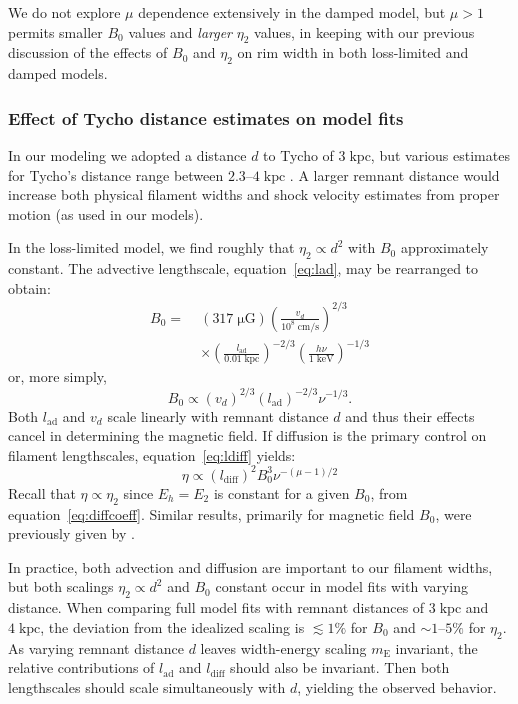 \documentclass[manuscript]{aastex}  %
\newcommand*{\mt}{\mathrm}
\newcommand*{\unit}[1]{\;\mt{#1}}  %
\newcommand*{\abt}{\mathord{\sim}} %
\newcommand*{\mE}{m_\mt{E}}
\newcommand*{\muG}{\unit{\mu G}}
\begin{document}
We do not explore $\mu$ dependence extensively in the damped model, but
$\mu > 1$ permits smaller $B_0$ values and \emph{larger} $\eta_2$ values, in
keeping with our previous discussion of the effects of $B_0$ and $\eta_2$ on
rim width in both loss-limited and damped models.

\subsubsection{Effect of Tycho distance estimates on model fits}

In our modeling we adopted a distance $d$ to Tycho of $3 \unit{kpc}$, but
various estimates for Tycho's distance range between $2.3$--$4 \unit{kpc}$
\citep{hayato2010}.  A larger remnant distance would increase both physical
filament widths and shock velocity estimates from proper motion (as used in our
models).

In the loss-limited model, we find roughly that $\eta_2 \propto d^2$ with
$B_0$ approximately constant.  The advective lengthscale,
equation~\eqref{eq:lad}, may be rearranged to obtain:
\begin{align}
    B_0 =\; &(317 \muG) \left(\frac{v_d}{10^8 \unit{cm/s}}\right)^{2/3}
                \nonumber \\
            &\times \left(\frac{l_{\mt{ad}}}{0.01 \unit{kpc}}\right)^{-2/3}
                \left(\frac{h\nu}{1 \unit{keV}}\right)^{-1/3}
\end{align}
or, more simply,
\begin{equation}
    B_0 \propto \left(v_d\right)^{2/3}
                \left(l_{\mt{ad}}\right)^{-2/3} \nu^{-1/3} .
\end{equation}
Both $l_{\mt{ad}}$ and $v_d$ scale linearly with remnant distance $d$ and thus
their effects cancel in determining the magnetic field.  If diffusion is the
primary control on filament lengthscales, equation~\eqref{eq:ldiff} yields:
\begin{equation}
    \eta \propto \left(l_{\mt{diff}}\right)^2 B_0^{3} \nu^{-(\mu - 1)/2}
\end{equation}
Recall that $\eta \propto \eta_2$ since $E_h = E_2$ is constant for a given
$B_0$, from equation~\eqref{eq:diffcoeff}.  Similar results, primarily for
magnetic field $B_0$, were previously given by \citet{parizot2006}.

In practice, both advection and diffusion are important to our filament widths,
but both scalings $\eta_2 \propto d^2$ and $B_0$ constant occur in model fits
with varying distance.  When comparing full model fits with remnant distances
of $3 \unit{kpc}$ and $4 \unit{kpc}$, the deviation from the idealized scaling
is $\lesssim 1 \%$ for $B_0$ and $\abt 1$--$5\%$ for $\eta_2$.  As varying
remnant distance $d$ leaves width-energy scaling $\mE$ invariant, the relative
contributions of $l_{\mt{ad}}$ and $l_{\mt{diff}}$ should also be invariant.
Then both lengthscales should scale simultaneously with $d$, yielding the
observed behavior.
\end{document}
